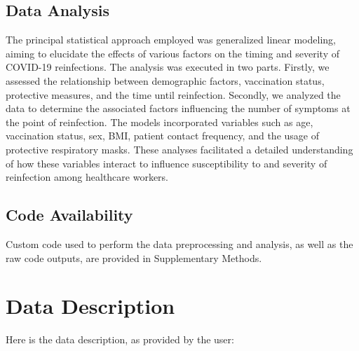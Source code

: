 \documentclass[11pt]{article}
\begin{document}
\subsection*{Data Analysis}
The principal statistical approach employed was generalized linear modeling, aiming to elucidate the effects of various factors on the timing and severity of COVID-19 reinfections. The analysis was executed in two parts. Firstly, we assessed the relationship between demographic factors, vaccination status, protective measures, and the time until reinfection. Secondly, we analyzed the data to determine the associated factors influencing the number of symptoms at the point of reinfection. The models incorporated variables such as age, vaccination status, sex, BMI, patient contact frequency, and the usage of protective respiratory masks. These analyses facilitated a detailed understanding of how these variables interact to influence susceptibility to and severity of reinfection among healthcare workers.\subsection*{Code Availability}

Custom code used to perform the data preprocessing and analysis, as well as the raw code outputs, are provided in Supplementary Methods.






\clearpage
\appendix

\section{Data Description} \label{sec:data_description} Here is the data description, as provided by the user:
\end{document}
